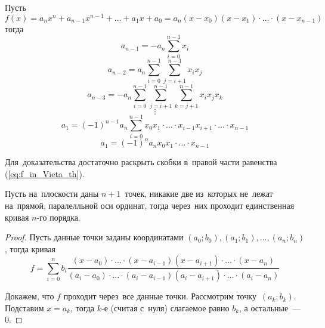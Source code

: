 \begin{theorem}
Пусть 
\begin{equation}
\label{eq:f_in_Vieta_th}
f(x) = a_n x^n + a_{n-1} x^{n-1} + \ldots + a_1 x + a_0 = a_n(x - x_0)(x - x_1) \cdot \ldots \cdot (x - x_{n-1})
\end{equation}
тогда
\begin{equation*}
a_{n-1} = -a_n \sum_{i=0}^{n-1} x_i
\end{equation*}
\begin{equation*}
a_{n-2} = a_n \sum_{i=0}^{n-1} \sum_{j=i+1}^{n-1} x_i x_j
\end{equation*}
\begin{equation*}
a_{n-3} = -a_n \sum_{i=0}^{n-1} \sum_{j=i+1}^{n-1} \sum_{k=j+1}^{n-1} x_i x_j x_k
\end{equation*}
\begin{equation*}
\vdots
\end{equation*}
\begin{equation*}
a_1 = (-1)^{n-1} a_n \sum_{i=0}^{n-1} x_0 x_1 \cdot \ldots \cdot x_{i-1} x_{i+1} \cdot \ldots \cdot x_{n-1}
\end{equation*}
\begin{equation*}
a_1 = (-1)^n a_n x_0 x_1 \cdot \ldots \cdot x_{n-1}
\end{equation*}
\end{theorem}%
Для~доказательства достаточно раскрыть скобки в~правой части равенства (\ref{eq:f_in_Vieta_th}).

\begin{theorem}
Пусть на~плоскости даны $n + 1$~точек, никакие две из~которых не~лежат на~прямой, паралелльной оси ординат, тогда через~них проходит единственная кривая $n$\nobreakdash-го порядка.
\end{theorem}
\begin{proof}
Пусть данные точки заданы координатами $(a_0; b_0), (a_1; b_1), \ldots, (a_n; b_n)$, тогда кривая
\begin{equation*}
f = \sum_{i=0}^n b_i \frac
{(x - a_0) \cdot \ldots \cdot (x - a_{i-1})(x - a_{i+1}) \cdot \ldots \cdot (x - a_n)}
{(a_i - a_0) \cdot \ldots \cdot (a_i - a_{i-1})(a_i - a_{i+1}) \cdot \ldots \cdot (a_i - a_n)}
\end{equation*}

Докажем, что $f$ проходит через~все данные точки.
Рассмотрим точку~$(a_k; b_k)$.
Подставим $x = a_k$, тогда $k$\nobreakdash-е (считая с~нуля) слагаемое равно $b_k$, а остальные~--- 0.
\end{proof}